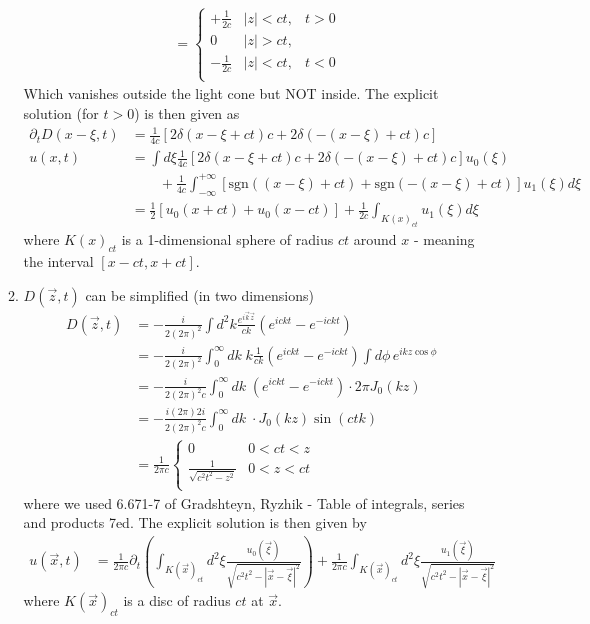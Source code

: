 \documentclass[../main.tex]{subfiles}
\begin{document}
\begin{itemize}
\begin{enumerate}
\begin{align}
&=\left\{\begin{matrix}
+\frac{1}{2c}&|z|<ct,& t>0\\
0& |z|>ct,&\\
-\frac{1}{2c}&|z|<ct,& t<0\\
\end{matrix}\right.
\end{align}
Which vanishes outside the light cone but NOT inside. The explicit solution (for $t>0$) is then given as 
\begin{align}
\partial_t D(x-\xi,t)&=\frac{1}{4c}\left[2\delta(x-\xi+ct)c+2\delta(-(x-\xi)+ct)c\right]\\
u(x,t)
&=\int d\xi \frac{1}{4c}\left[2\delta(x-\xi+ct)c+2\delta(-(x-\xi)+ct)c\right]u_0(\xi)\\
&\qquad+\frac{1}{4c}\int_{-\infty}^{+\infty}\left[\text{sgn}((x-\xi)+ct)+\text{sgn}(-(x-\xi)+ct)\right]u_1(\xi)d\xi\\
&=\frac{1}{2}\left[u_0(x+ct)+u_0(x-ct)\right]+\frac{1}{2c}\int_{K(x)_{ct}}u_1(\xi)d\xi
\end{align}
where $K(x)_{ct}$ is a 1-dimensional sphere of radius $ct$ around $x$ - meaning the interval $[x-ct,x+ct]$.

\item $D(\vec{z},t)$ can be simplified (in two dimensions)
\begin{align}
D(\vec{z},t)&=-\frac{i}{2(2\pi)^2}\int d^2k\frac{e^{i\vec{k}\vec{z}}}{ck}(e^{ickt}-e^{-ickt})\\
&=-\frac{i}{2(2\pi)^2}\int_0^\infty dk\;k\frac{1}{ck}(e^{ickt}-e^{-ickt})\int d\phi\,e^{ikz\cos\phi}\\
&=-\frac{i}{2(2\pi)^2c}\int_0^\infty dk\;(e^{ickt}-e^{-ickt})\cdot 2\pi J_0(kz)\\
&=-\frac{i(2\pi)2i}{2(2\pi)^2c}\int_0^\infty dk\;\cdot J_0(kz)\sin(ctk)\\
&=\frac{1}{2\pi c}\left\{\begin{matrix}
0& 0<ct<z\\
\frac{1}{\sqrt{c^2t^2-z^2}}& 0<z<ct\\
\end{matrix}\right.
\end{align}
where we used 6.671-7 of Gradshteyn, Ryzhik - Table of integrals, series and products 7ed.
The explicit solution is then given by
\begin{align}
u(\vec{x},t)&=\frac{1}{2\pi c}\partial_t\left(\int_{K(\vec{x})_{ct}} d^2\xi \frac{u_0(\vec{\xi})}{\sqrt{c^2t^2-|\vec{x}-\vec{\xi}|^2}}\right)+\frac{1}{2\pi c}\int_{K(\vec{x})_{ct}} d^2\xi \frac{u_1(\vec{\xi})}{\sqrt{c^2t^2-|\vec{x}-\vec{\xi}|^2}}
\end{align}
where $K(\vec{x})_{ct}$ is a disc of radius $ct$ at $\vec{x}$.



\end{enumerate}
\end{itemize}
\end{document}
